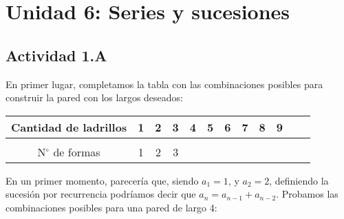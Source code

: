 \section*{Unidad 6: Series y sucesiones}
%

\subsection*{Actividad 1.A}

En primer lugar, completamos la tabla con las combinaciones posibles
para construir la pared con los largos deseados:

\begin{center}
    \begin{tabular}{ c c c c c c c c c c c c }
        Cantidad de ladrillos   & 1 & 2 & 3 & 4 & 5 & 6 & 7 & 8 & 9 \\
        \hline                  &                                   \\ [-1em]
        N\(^{\circ}\) de formas & 1 & 2 & 3 &   &   &   &   &   &   \\
        \hline
    \end{tabular}
\end{center}

En un primer momento, parecería que, siendo \(a_{1}=1\),
y \(a_{2}=2\), definiendo la sucesión por recurrencia podríamos decir que
\(a_n = a_{n-1} + a_{n-2}\).
Probamos las combinaciones posibles para una pared de largo 4:

\begin{center}
\end{center}

\begin{center}
\end{center}

